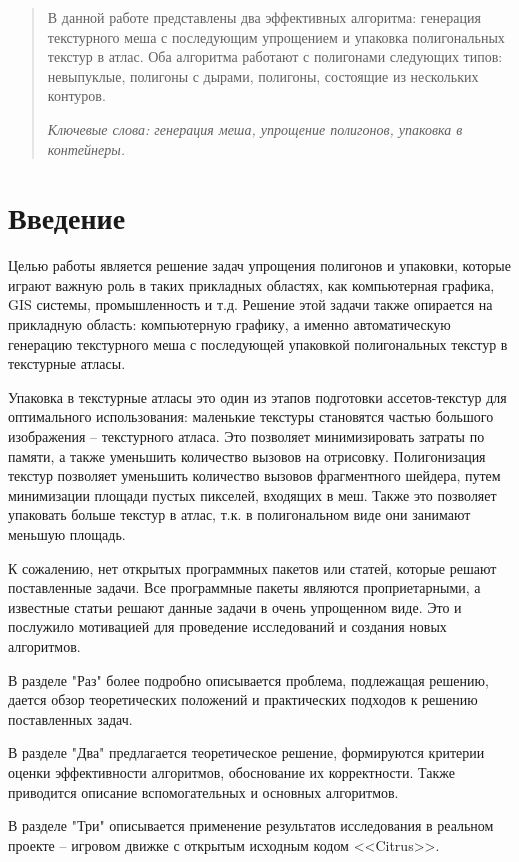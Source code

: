 \documentclass{fefu_thesis/cls/fefu}
\author{Терехов Д.Е.}
\begin{document}
    \tableofcontents
    \pagebreak
    \begin{abstract}
        В данной работе представлены два эффективных алгоритма: генерация текстурного меша с последующим упрощением и упаковка полигональных текстур в атлас. Оба алгоритма работают с полигонами следующих типов: невыпуклые, полигоны с дырами, полигоны, состоящие из нескольких контуров.

        \textit{Ключевые слова: генерация меша, упрощение полигонов, упаковка в контейнеры.}
    \end{abstract}
    \pagebreak
    {\centering\section*{Введение}}
    Целью работы является решение задач упрощения полигонов и упаковки, которые играют важную роль в таких прикладных областях, как компьютерная графика, GIS системы, промышленность и т.д. Решение этой задачи также опирается на прикладную область: компьютерную графику, а именно автоматическую генерацию текстурного меша с последующей упаковкой полигональных текстур в текстурные атласы.

    Упаковка в текстурные атласы это один из этапов подготовки ассетов-текстур для оптимального использования: маленькие текстуры становятся частью большого изображения -- текстурного атласа. Это позволяет минимизировать затраты по памяти, а также уменьшить количество вызовов на отрисовку. Полигонизация текстур позволяет уменьшить количество вызовов фрагментного шейдера, путем минимизации площади пустых пикселей, входящих в меш. Также это позволяет упаковать больше текстур в атлас, т.к. в полигональном виде они занимают меньшую площадь.

    К сожалению, нет открытых программных пакетов или статей, которые решают поставленные задачи. Все программные пакеты являются проприетарными, а известные статьи решают данные задачи в очень упрощенном виде. Это и послужило мотивацией для проведение исследований и создания новых алгоритмов.

    В разделе "Раз" более подробно описывается проблема, подлежащая решению, дается обзор теоретических положений и практических подходов к решению поставленных задач.

    В разделе "Два" предлагается теоретическое решение, формируются критерии оценки эффективности алгоритмов, обоснование их корректности. Также приводится описание вспомогательных и основных алгоритмов.

    В разделе "Три" описывается применение результатов исследования в реальном проекте -- игровом движке с открытым исходным кодом <<Citrus>>.
\end{document}
